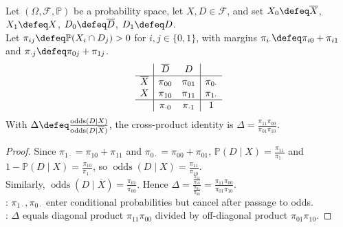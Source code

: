 \begin{proposition} \label{prop:odds-ratio-cross-product} \\
Let $(\Omega,\mathcal{F},\mathbb{P})$ be a probability space, let $X,D\in\mathcal{F}$, and set $X_0\defeq\overline{X}$, $X_1\defeq X$, $D_0\defeq\overline{D}$, $D_1\defeq D$.\\
Let $\pi_{ij}\defeq\mathbb{P}(X_i\cap D_j)>0$ for $i,j\in\{0,1\}$, with margins $\pi_{i\cdot}\defeq\pi_{i0}+\pi_{i1}$ and $\pi_{\cdot j}\defeq\pi_{0j}+\pi_{1j}$.
\[
\begin{array}{c|cc|c}
&\overline{D}&D&\\ \hline
\overline{X}&\pi_{00}&\pi_{01}&\pi_{0\cdot}\\
X&\pi_{10}&\pi_{11}&\pi_{1\cdot}\\ \hline
&\pi_{\cdot0}&\pi_{\cdot1}&1
\end{array}
\]
With $\Delta\defeq\frac{\operatorname{odds}(D\mid X)}{\operatorname{odds}(D\mid\overline{X})}$, the cross-product identity is $\Delta = \frac{\pi_{11}\pi_{00}}{\pi_{01}\pi_{10}}$.
\begin{proof} Since $\pi_{1\cdot}=\pi_{10}+\pi_{11}$ and $\pi_{0\cdot}=\pi_{00}+\pi_{01}$, $\mathbb{P}(D\mid X)=\frac{\pi_{11}}{\pi_{1\cdot}}$ and $1-\mathbb{P}(D\mid X)=\frac{\pi_{10}}{\pi_{1\cdot}}$, so $\operatorname{odds}(D\mid X)=\frac{\pi_{11}}{\pi_{10}}$.\\
Similarly, $\operatorname{odds}(D\mid\overline{X})=\frac{\pi_{01}}{\pi_{00}}$. Hence $\Delta=\frac{\frac{\pi_{11}}{\pi_{10}}}{\frac{\pi_{01}}{\pi_{00}}}=\frac{\pi_{11}\pi_{00}}{\pi_{01}\pi_{10}}$.\\
: $\pi_{1\cdot},\pi_{0\cdot}$ enter conditional probabilities but cancel after passage to odds.\\
: $\Delta$ equals diagonal product $\pi_{11}\pi_{00}$ divided by off-diagonal product $\pi_{01}\pi_{10}$.
\end{proof}
\end{proposition}

